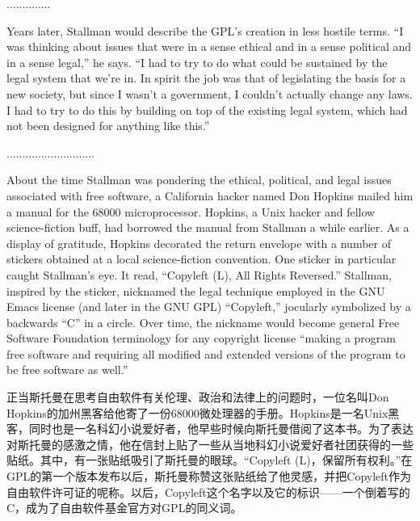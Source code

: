 {\ifdefined\chs
..............
\fi

\ifdefined{}} Years later, Stallman would describe the GPL's creation in less hostile terms. ``I was thinking about issues that were in a sense ethical and in a sense political and in a sense legal,'' he says. ``I had to try to do what could be sustained by the legal system that we're in. In spirit the job was that of legislating the basis for a new society, but since I wasn't a government, I couldn't actually change any laws. I had to try to do this by building on top of the existing legal system, which had not been designed for anything like this.''
\fi

\ifdefined\chs
............................
\fi

\ifdefined\eng
About the time Stallman was pondering the ethical, political, and legal issues associated with free software, a California hacker named Don Hopkins mailed him a manual for the 68000 microprocessor. Hopkins, a Unix hacker and fellow science-fiction buff, had borrowed the manual from Stallman a while earlier. As a display of gratitude, Hopkins decorated the return envelope with a number of stickers obtained at a local science-fiction convention. One sticker in particular caught Stallman's eye. It read, ``Copyleft (L), All Rights Reversed.''  Stallman, inspired by the sticker, nicknamed the legal technique employed in the GNU Emacs license (and later in the GNU GPL) ``Copyleft,'' jocularly symbolized by a backwards ``C'' in a circle. Over time, the nickname would become general Free Software Foundation terminology for any copyright license ``making a program free software and requiring all modified and extended versions of the program to be free software as well.''
\fi

\ifdefined\chs
正当斯托曼在思考自由软件有关伦理、政治和法律上的问题时，一位名叫Don Hopkins的加州黑客给他寄了一份68000微处理器的手册。Hopkins是一名Unix黑客，同时也是一名科幻小说爱好者，他早些时候向斯托曼借阅了这本书。为了表达对斯托曼的感激之情，他在信封上贴了一些从当地科幻小说爱好者社团获得的一些贴纸。其中，有一张贴纸吸引了斯托曼的眼球。``Copyleft (L)，保留所有权利。''在GPL的第一个版本发布以后，斯托曼称赞这张贴纸给了他灵感，并把Copyleft作为自由软件许可证的呢称。以后，Copyleft这个名字以及它的标识——一个倒着写的C，成为了自由软件基金官方对GPL的同义词。
\fi

